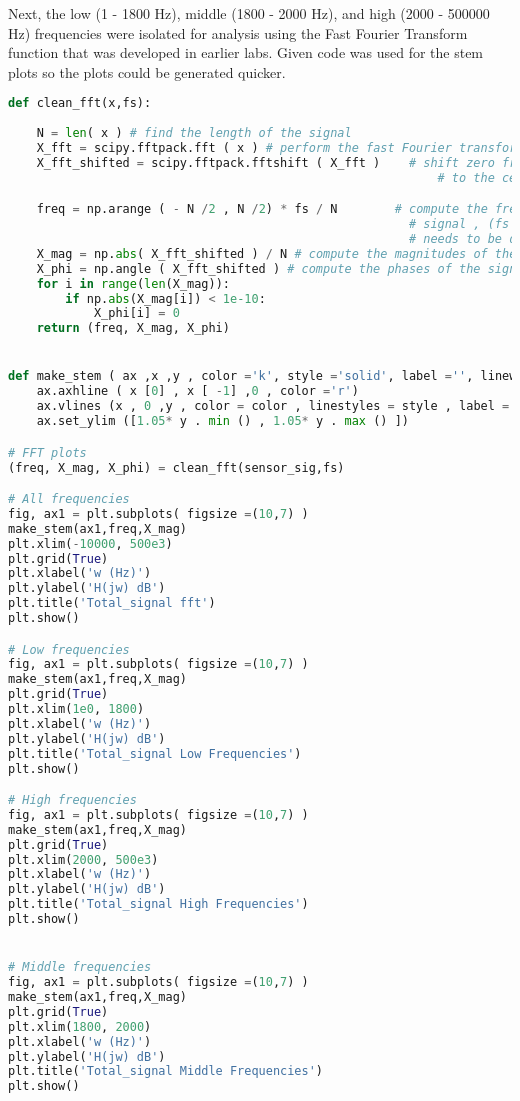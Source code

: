 \documentclass[12pt]{report}
\begin{document}
Next, the low (1 - 1800 Hz), middle (1800 - 2000 Hz), and high (2000 - 500000 Hz) frequencies were isolated for analysis using the Fast Fourier Transform function that was developed in earlier labs. Given code was used for the stem plots so the plots could be generated quicker.

\begin{lstlisting}[language=Python, caption= FFT and Plots of signal]
def clean_fft(x,fs):
    
    N = len( x ) # find the length of the signal
    X_fft = scipy.fftpack.fft ( x ) # perform the fast Fourier transform (fft)
    X_fft_shifted = scipy.fftpack.fftshift ( X_fft )    # shift zero frequency components
                                                            # to the center of the spectrum

    freq = np.arange ( - N /2 , N /2) * fs / N        # compute the frequencies for the output
                                                        # signal , (fs is the sampling frequency and
                                                        # needs to be defined previously in your code
    X_mag = np.abs( X_fft_shifted ) / N # compute the magnitudes of the signal
    X_phi = np.angle ( X_fft_shifted ) # compute the phases of the signal
    for i in range(len(X_mag)):
        if np.abs(X_mag[i]) < 1e-10:
            X_phi[i] = 0
    return (freq, X_mag, X_phi)


def make_stem ( ax ,x ,y , color ='k', style ='solid', label ='', linewidths =2.5 ,** kwargs) :
    ax.axhline ( x [0] , x [ -1] ,0 , color ='r')
    ax.vlines (x , 0 ,y , color = color , linestyles = style , label = label , linewidths = linewidths )
    ax.set_ylim ([1.05* y . min () , 1.05* y . max () ])

# FFT plots
(freq, X_mag, X_phi) = clean_fft(sensor_sig,fs) 

# All frequencies
fig, ax1 = plt.subplots( figsize =(10,7) )
make_stem(ax1,freq,X_mag)
plt.xlim(-10000, 500e3)
plt.grid(True)
plt.xlabel('w (Hz)')
plt.ylabel('H(jw) dB')
plt.title('Total_signal fft')
plt.show()

# Low frequencies
fig, ax1 = plt.subplots( figsize =(10,7) )
make_stem(ax1,freq,X_mag)
plt.grid(True)
plt.xlim(1e0, 1800)
plt.xlabel('w (Hz)')
plt.ylabel('H(jw) dB')
plt.title('Total_signal Low Frequencies')
plt.show()

# High frequencies
fig, ax1 = plt.subplots( figsize =(10,7) )
make_stem(ax1,freq,X_mag)
plt.grid(True)
plt.xlim(2000, 500e3)
plt.xlabel('w (Hz)')
plt.ylabel('H(jw) dB')
plt.title('Total_signal High Frequencies')
plt.show()


# Middle frequencies
fig, ax1 = plt.subplots( figsize =(10,7) )
make_stem(ax1,freq,X_mag)
plt.grid(True)
plt.xlim(1800, 2000)
plt.xlabel('w (Hz)')
plt.ylabel('H(jw) dB')
plt.title('Total_signal Middle Frequencies')
plt.show()
\end{lstlisting}
\end{document}
